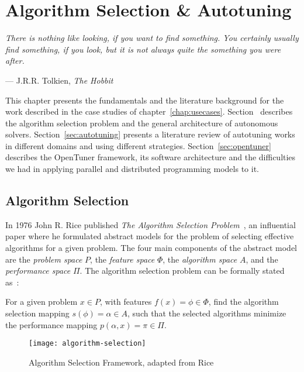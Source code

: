 \chapter{Algorithm Selection \& Autotuning}
\label{chap:autonomous}
\epigraph{\textit{There is nothing like looking, if you want to find something. You
certainly usually find something, if you look, but it is not always quite the
something you were after.}}{--- J.R.R. Tolkien, \textit{The Hobbit}}

This chapter presents the fundamentals and the literature background for the
work described in the case studies of chapter~\ref{chap:usecases}.
Section~\label{sec:algselres} describes the algorithm selection problem and
the general architecture of autonomous solvers.
Section~\ref{sec:autotuning} presents a literature review of autotuning works
in different domains and using different strategies.
Section~\ref{sec:opentuner} describes the OpenTuner framework, its software
architecture and the difficulties we had in applying parallel and distributed
programming models to it.

\section{Algorithm Selection}
\label{sec:algselres}

In 1976 John R. Rice published \textit{The Algorithm Selection
Problem}~\cite{rice1976algorithm}, an influential paper where he formulated
abstract models for the problem of selecting effective algorithms for a given
problem. The four main components of the abstract model are the \textit{problem
space} $P$, the \textit{feature space} $\Phi$, the \textit{algorithm space}
$A$, and the \textit{performance space} $\Pi$. The algorithm selection problem
can be formally stated as~\cite{smith2009cross}:

\begin{definition}
    For a given problem $x \in P$, with features $f(x) = \phi \in \Phi$,
    find the algorithm selection mapping $s(\phi) = \alpha \in A$, such
    that the selected algorithms minimize the performance mapping
    $p(\alpha,x) = \pi \in \Pi$.
\end{definition}

\begin{figure}[htpb]
    \begin{center}
        \texttt{[image: algorithm-selection]}
    \end{center}
    \caption{Algorithm Selection Framework, adapted from
    Rice~\cite{rice1976algorithm}}
    \label{fig:riceframe}
\end{figure}

